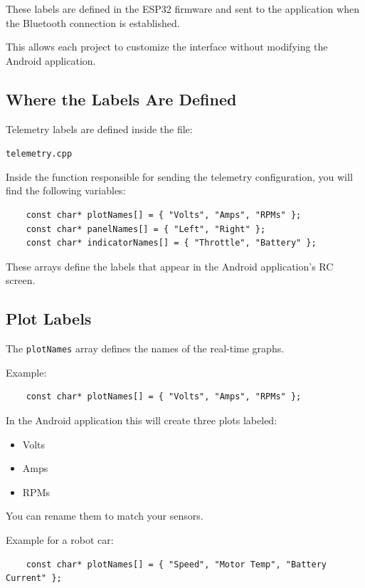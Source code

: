 These labels are defined in the ESP32 firmware and sent to the
application when the Bluetooth connection is established.

This allows each project to customize the interface without modifying
the Android application.

\subsection{Where the Labels Are Defined}

Telemetry labels are defined inside the file:

\begin{center}
	\texttt{telemetry.cpp}
\end{center}

Inside the function responsible for sending the telemetry configuration,
you will find the following variables:

\begin{verbatim}
	const char* plotNames[] = { "Volts", "Amps", "RPMs" };
	const char* panelNames[] = { "Left", "Right" };
	const char* indicatorNames[] = { "Throttle", "Battery" };
\end{verbatim}

These arrays define the labels that appear in the Android application's
RC screen.

\subsection{Plot Labels}

The \texttt{plotNames} array defines the names of the real-time graphs.

Example:

\begin{verbatim}
	const char* plotNames[] = { "Volts", "Amps", "RPMs" };
\end{verbatim}

In the Android application this will create three plots labeled:

\begin{itemize}
	\item Volts
	\item Amps
	\item RPMs
\end{itemize}

You can rename them to match your sensors.

Example for a robot car:

\begin{verbatim}
	const char* plotNames[] = { "Speed", "Motor Temp", "Battery Current" };
\end{verbatim}


